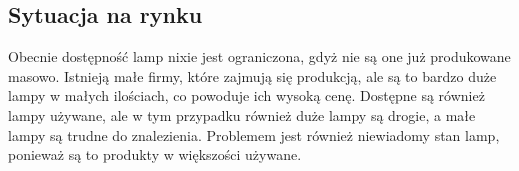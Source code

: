 \documentclass[../main.tex]{subfiles}
\begin{document}
\subsection{Sytuacja na rynku}
Obecnie dostępność lamp nixie jest ograniczona, gdyż nie są one już produkowane masowo. Istnieją małe firmy, które zajmują się produkcją, ale są to bardzo
duże lampy w małych ilościach, co powoduje ich wysoką cenę. Dostępne są również lampy używane, ale w tym przypadku również duże lampy są drogie, a małe lampy są trudne do znalezienia.
Problemem jest również niewiadomy stan lamp, ponieważ są to produkty w większości używane.
\end{document}
